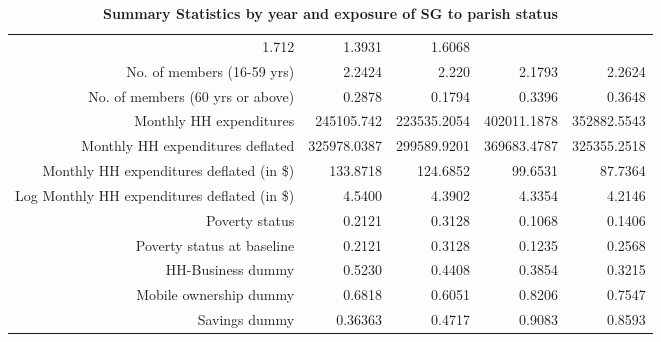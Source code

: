\begin{sidewaystable}[!h]
\begin{tabular}{lllll}
  \multicolumn{1}{|r}{1.712} &
  \multicolumn{1}{|r}{1.3931} &
  \multicolumn{1}{|r|}{1.6068}  \\
\multicolumn{1}{|r}{No. of members (16-59 yrs)} &
  \multicolumn{1}{|r}{2.2424} &
  \multicolumn{1}{|r}{2.220} &
  \multicolumn{1}{|r}{2.1793} &
  \multicolumn{1}{|r|}{2.2624}  \\
\multicolumn{1}{|r}{No. of members (60 yrs or above)} &
  \multicolumn{1}{|r}{0.2878} &
  \multicolumn{1}{|r}{0.1794} &
  \multicolumn{1}{|r}{0.3396} &
  \multicolumn{1}{|r|}{0.3648}  \\
\multicolumn{1}{|r}{Monthly HH expenditures} &
  \multicolumn{1}{|r}{245105.742} &
  \multicolumn{1}{|r}{223535.2054} &
  \multicolumn{1}{|r}{402011.1878} &
  \multicolumn{1}{|r|}{352882.5543} \\
\multicolumn{1}{|r}{Monthly HH expenditures deflated} &
  \multicolumn{1}{|r}{325978.0387} &
  \multicolumn{1}{|r}{299589.9201} &
  \multicolumn{1}{|r}{369683.4787} &
  \multicolumn{1}{|r|}{325355.2518}  \\
\multicolumn{1}{|r}{Monthly HH expenditures deflated (in \$)} &
  \multicolumn{1}{|r}{133.8718} &
  \multicolumn{1}{|r}{124.6852} &
  \multicolumn{1}{|r}{99.6531} &
  \multicolumn{1}{|r|}{87.7364}  \\
\multicolumn{1}{|r}{Log Monthly HH expenditures deflated (in \$)} &
  \multicolumn{1}{|r}{4.5400} &
  \multicolumn{1}{|r}{4.3902} &
  \multicolumn{1}{|r}{4.3354} &
  \multicolumn{1}{|r|}{4.2146}  \\
\multicolumn{1}{|r}{Poverty status} &
  \multicolumn{1}{|r}{0.2121} &
  \multicolumn{1}{|r}{0.3128} &
  \multicolumn{1}{|r}{0.1068} &
  \multicolumn{1}{|r|}{0.1406}  \\
\multicolumn{1}{|r}{Poverty status at baseline} &
  \multicolumn{1}{|r}{0.2121} &
  \multicolumn{1}{|r}{0.3128} &
  \multicolumn{1}{|r}{0.1235} &
  \multicolumn{1}{|r|}{0.2568}  \\
\multicolumn{1}{|r}{HH-Business dummy} &
  \multicolumn{1}{|r}{0.5230} &
  \multicolumn{1}{|r}{0.4408} &
  \multicolumn{1}{|r}{0.3854} &
  \multicolumn{1}{|r|}{0.3215} \\
\multicolumn{1}{|r}{Mobile ownership dummy} &
  \multicolumn{1}{|r}{0.6818} &
  \multicolumn{1}{|r}{0.6051} &
  \multicolumn{1}{|r}{0.8206} &
  \multicolumn{1}{|r|}{0.7547}  \\
\multicolumn{1}{|r}{Savings dummy} &
  \multicolumn{1}{|r}{0.36363} &
  \multicolumn{1}{|r}{0.4717} &
  \multicolumn{1}{|r}{0.9083} &
  \multicolumn{1}{|r|}{0.8593}  \\
\cline{1-5}
\end{tabular}
\caption{\bfseries Summary Statistics by year and exposure of SG to parish status}
\end{sidewaystable}






